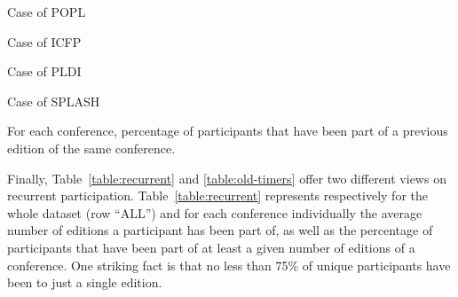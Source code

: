 \begin{table}
  \centering
  \begin{subtable}[b]{0.4\textwidth}
    \centering
    \caption{Case of POPL}
  \end{subtable}
  \begin{subtable}[b]{0.4\textwidth}
    \centering
    \caption{Case of ICFP}
  \end{subtable}
  \begin{subtable}[b]{0.4\textwidth}
    \centering
    \caption{Case of PLDI}
  \end{subtable}
  \begin{subtable}[b]{0.4\textwidth}
    \centering
    \caption{Case of SPLASH}
  \end{subtable}
  \caption{For each conference, percentage of participants that have been
    part of a previous edition of the same conference.}
  \label{table:old-timers}
\end{table}

Finally, Table~\ref{table:recurrent} and \ref{table:old-timers} offer two
different views on recurrent participation. Table~\ref{table:recurrent}
represents respectively for the whole dataset (row ``ALL'') and for each
conference individually the average number of editions a participant has
been part of, as well as the percentage of participants that have been part
of at least a given number of editions of a conference. One striking fact is
that no less than 75\% of unique participants have been to just a single
edition.

